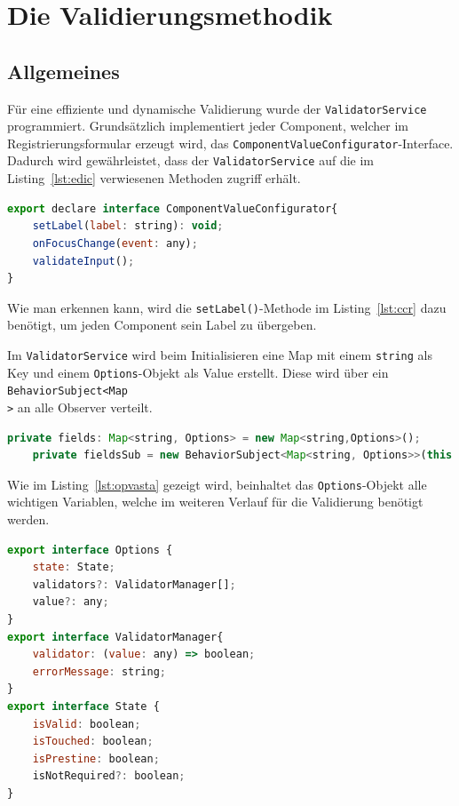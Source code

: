 \section{Die Validierungsmethodik}
\subsection{Allgemeines}

Für eine effiziente und dynamische Validierung wurde der \texttt{ValidatorService} programmiert. Grundsätzlich implementiert jeder Component, welcher im Registrierungsformular erzeugt wird, das \texttt{ComponentValueConfigurator}-Interface. Dadurch wird gewährleistet, dass der \texttt{ValidatorService} auf die im Listing~\ref{lst:edic} verwiesenen Methoden zugriff erhält.

\begin{lstlisting}[caption={Methoden aus dem \texttt{ComponentValueConfigurator}-Interface}, language=JavaScript,label={lst:edic}]
export declare interface ComponentValueConfigurator{
	setLabel(label: string): void;
	onFocusChange(event: any);
	validateInput();
}
\end{lstlisting}

Wie man erkennen kann, wird die \texttt{setLabel()}-Methode im Listing~\ref{lst:ccr} dazu benötigt, um jeden Component sein Label zu übergeben.

Im \texttt{ValidatorService} wird beim Initialisieren eine Map mit einem \texttt{string} als Key und einem \texttt{Options}-Objekt als Value erstellt. Diese wird über ein \texttt{BehaviorSubject<Map\\<string, Options>>} an alle Observer verteilt.

\begin{lstlisting}[caption={Die \texttt{fields}-Map und ihr Subject}, language=JavaScript]
	private fields: Map<string, Options> = new Map<string,Options>();
	private fieldsSub = new BehaviorSubject<Map<string, Options>>(this.fields);
\end{lstlisting}

Wie im Listing~\ref{lst:opvasta} gezeigt wird, beinhaltet das \texttt{Options}-Objekt alle wichtigen Variablen, welche im weiteren Verlauf für die Validierung benötigt werden.

\begin{lstlisting}[caption={Das \texttt{Options}-Objekt und seine abhängigen Objekte}, language=JavaScript,label={lst:opvasta}]
export interface Options {
	state: State;
	validators?: ValidatorManager[];
	value?: any;
}
export interface ValidatorManager{
	validator: (value: any) => boolean;
	errorMessage: string;
}
export interface State {
	isValid: boolean;
	isTouched: boolean;
	isPrestine: boolean;
	isNotRequired?: boolean;
}
\end{lstlisting}

